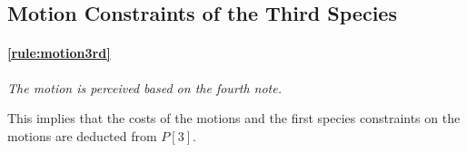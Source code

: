 \subsection{Motion Constraints of the Third Species}
\paragraph{\ref{rule:motion3rd}} \textit{The motion is perceived based on the fourth note.}

This implies that the costs of the motions and the first species constraints on the motions are deducted from $P[3]$.